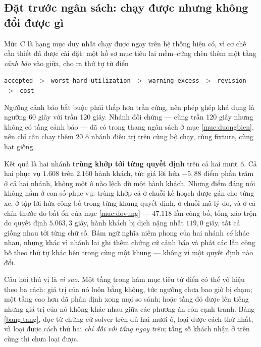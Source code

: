 \subsection{Đặt trước ngân sách: chạy được nhưng không đổi được gì}

Mức C là hạng mục duy nhất chạy được ngay trên hệ thống hiện có, vì cơ chế cần thiết đã được
cài đặt: một hồ sơ mục tiêu lai mềm--cứng chèn thêm một tầng \emph{cảnh báo} vào giữa, cho ra
thứ tự từ điển

\begin{center}
\texttt{accepted} $\;>\;$ \texttt{worst-hard-utilization} $\;>\;$ \texttt{warning-excess}
$\;>\;$ \texttt{revision} $\;>\;$ \texttt{cost}
\end{center}

Ngưỡng cảnh báo bắt buộc phải thấp hơn trần cứng, nên phép ghép khả dụng là ngưỡng 60 giây với
trần 120 giây. Nhánh đối chứng --- cùng trần 120 giây nhưng không có tầng cảnh báo --- đã có
trong thang ngân sách ở mục \ref{muc:duongbien}, nên chỉ cần chạy thêm 20 ô nhánh điều trị trên
cùng bộ chạy, cùng fixture, cùng hạt giống.

Kết quả là hai nhánh \textbf{trùng khớp tới từng quyết định} trên cả hai mươi ô. Cả hai phục vụ
$1.608$ trên $2.160$ hành khách, tức giá lời hứa $-5{,}88$ điểm phần trăm ở cả hai nhánh, không
một ô nào lệch dù một hành khách. Nhưng điểm đáng nói không nằm ở con số phục vụ: trùng khớp cả
ở chuỗi kế hoạch được gán cho từng xe, ở tập lời hứa công bố trong từng khung quyết định, ở chuỗi
mã lý do, và ở cả chín thước đo bất ổn của mục \ref{muc:dovung} --- $47.118$ lần công bố, tổng
xáo trộn do quyết định $5.063{,}3$ giây, hành khách bị dịch nặng nhất $119{,}0$ giây, tất cả
giống nhau tới từng chữ số. Bám ngữ nghĩa niêm phong của hai nhánh \emph{có} khác nhau, nhưng
khác vì nhánh lai ghi thêm chứng cứ cảnh báo và phát các lần công bố theo thứ tự khác bên trong
cùng một khung --- không vì một quyết định nào đổi.

Câu hỏi thú vị là \emph{vì sao}. Một tầng trong hàm mục tiêu từ điển có thể vô hiệu theo ba cách:
giá trị của nó luôn bằng không, tức ngưỡng chưa bao giờ bị chạm; một tầng cao hơn đã phân định xong
mọi so sánh; hoặc tầng đó được lên tiếng nhưng giá trị của nó không khác nhau giữa các phương án
còn cạnh tranh. Bảng \ref{bang:tang}, đọc từ chứng cứ solver trên đủ hai mươi ô, loại được cách thứ
nhất, và loại được cách thứ hai \emph{chỉ đối với tầng ngay trên}; tầng số khách nhận ở trên cùng thì
chưa loại được.

